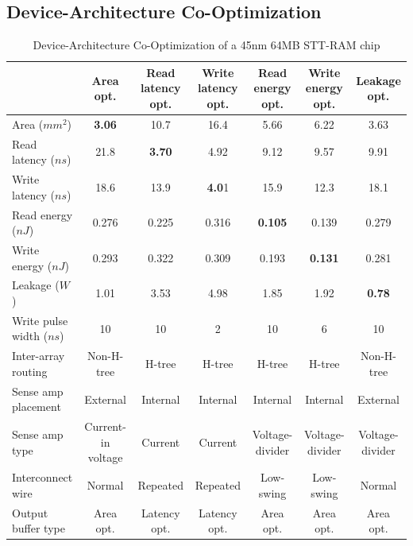 \subsection{Device-Architecture Co-Optimization}

\begin{table}[t]
\centering
\caption{Device-Architecture Co-Optimization of a 45nm 64MB STT-RAM chip}
\label{tb:bigtable}
\begin{tabular}{| l | c | c | c | c | c | c |}
\hline\hline
& Area opt. & Read latency opt. & Write latency opt. & Read energy opt. & Write energy opt. & Leakage opt. \\
\hline
Area ($mm^2$) & \textbf{3.06} & 10.7 & 16.4 & 5.66 & 6.22 & 3.63 \\
\hline
Read latency ($ns$) & 21.8 & \textbf{3.70} & 4.92 & 9.12 & 9.57 &	9.91 \\
\hline
Write latency ($ns$) & 18.6	& 13.9	& \textbf{4.0}1	& 15.9	& 12.3	& 18.1 \\
\hline
Read energy ($nJ$) & 0.276	& 0.225	& 0.316	& \textbf{0.105}	& 0.139	& 0.279 \\
\hline
Write energy ($nJ$) & 0.293	& 0.322	& 0.309	& 0.193	& \textbf{0.131}	& 0.281\\
\hline
Leakage ($W$) & 1.01	& 3.53	& 4.98	& 1.85	& 1.92	& \textbf{0.78}\\
\hline\hline
Write pulse width ($ns$) & 10 & 10 & 2 & 10 & 6 & 10 \\
\hline
Inter-array routing & Non-H-tree & H-tree & H-tree & H-tree & H-tree & Non-H-tree \\
\hline
Sense amp placement & External & Internal & Internal & Internal & Internal & External \\
\hline
Sense amp type & Current-in voltage & Current & Current & Voltage-divider & Voltage-divider & Voltage-divider \\
\hline
Interconnect wire & Normal & Repeated & Repeated & Low-swing & Low-swing & Normal \\
\hline
Output buffer type & Area opt. & Latency opt. & Latency opt. & Area opt. & Area opt. & Area opt. \\
\hline\hline
\end{tabular}
\end{table} 